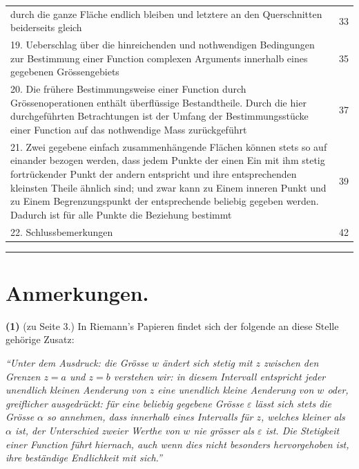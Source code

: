 \documentclass[12pt,a4paper]{article}
\begin{document}
\begin{center}
\begin{tabular}{p{}r}
\[\]
durch die ganze Fläche endlich bleiben und letztere an den Querschnitten beiderseits gleich \dotfill & 33\\[0.5em]
19. Ueberschlag über die hinreichenden und nothwendigen Bedingungen zur Bestimmung einer Function complexen Arguments innerhalb eines gegebenen Grössengebiets \dotfill & 35\\[0.5em]
20. Die frühere Bestimmungsweise einer Function durch Grössenoperationen enthält überflüssige Bestandtheile. Durch die hier durchgeführten Betrachtungen ist der Umfang der Bestimmungsstücke einer Function auf das nothwendige Mass zurückgeführt \dotfill & 37\\[0.5em]
21. Zwei gegebene einfach zusammenhängende Flächen können stets so auf einander bezogen werden, dass jedem Punkte der einen Ein mit ihm stetig fortrückender Punkt der andern entspricht und ihre entsprechenden kleinsten Theile ähnlich sind; und zwar kann zu Einem inneren Punkt und zu Einem Begrenzungspunkt der entsprechende beliebig gegeben werden. Dadurch ist für alle Punkte die Beziehung bestimmt \dotfill & 39\\[0.5em]
22. Schlussbemerkungen \dotfill & 42\\
\end{tabular}
\end{center}

\vspace{2em}
\begin{center}
\rule{0.5\textwidth}{0.4pt}
\end{center}
\vspace{1em}


\section*{Anmerkungen.}

\textbf{(1)} (zu Seite 3.) In Riemann's Papieren findet sich der folgende an diese Stelle gehörige Zusatz:

\smallskip
\textit{``Unter dem Ausdruck: die Grösse $w$ ändert sich stetig mit $z$ zwischen den Grenzen $z = a$ und $z = b$ verstehen wir: in diesem Intervall entspricht jeder unendlich kleinen Aenderung von $z$ eine unendlich kleine Aenderung von $w$ oder, greiflicher ausgedrückt: für eine beliebig gegebene Grösse $\varepsilon$ lässt sich stets die Grösse $\alpha$ so annehmen, dass innerhalb eines Intervalls für $z$, welches kleiner als $\alpha$ ist, der Unterschied zweier Werthe von $w$ nie grösser als $\varepsilon$ ist. Die Stetigkeit einer Function führt hiernach, auch wenn dies nicht besonders hervorgehoben ist, ihre beständige Endlichkeit mit sich.''}
\smallskip
\end{document}
